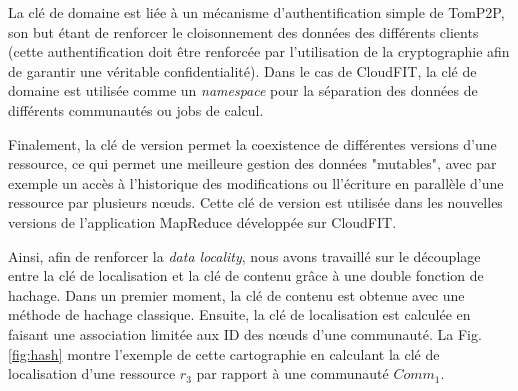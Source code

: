 La clé de domaine est liée à un mécanisme d'authentification simple de TomP2P, son but étant de renforcer le cloisonnement des données des différents clients (cette authentification doit être renforcée par l'utilisation de la cryptographie afin de garantir une véritable confidentialité). Dans le cas de CloudFIT, la clé de domaine est utilisée comme un \textit{namespace} pour la séparation des données de différents communautés ou jobs de calcul. 

Finalement, la clé de version permet la coexistence de différentes versions d'une ressource, ce qui permet une meilleure gestion des données "mutables", avec par exemple un accès à l'historique des modifications ou ll'écriture en parallèle d'une ressource par plusieurs n\oe{}uds. Cette clé de version est utilisée dans les nouvelles versions de l'application MapReduce développée sur CloudFIT.

Ainsi, afin de renforcer la \textit{data locality}, nous avons travaillé sur le découplage entre la clé de localisation et la clé de contenu grâce à une double fonction de hachage. Dans un premier moment, la clé de contenu est obtenue avec une méthode de hachage classique. Ensuite, la clé de localisation est calculée en faisant une association limitée aux ID des n\oe{}uds d'une communauté. La Fig. \ref{fig:hash} montre l'exemple de cette cartographie en calculant la clé de localisation d'une ressource $r_3$ par rapport à une communauté $Comm_1$.

